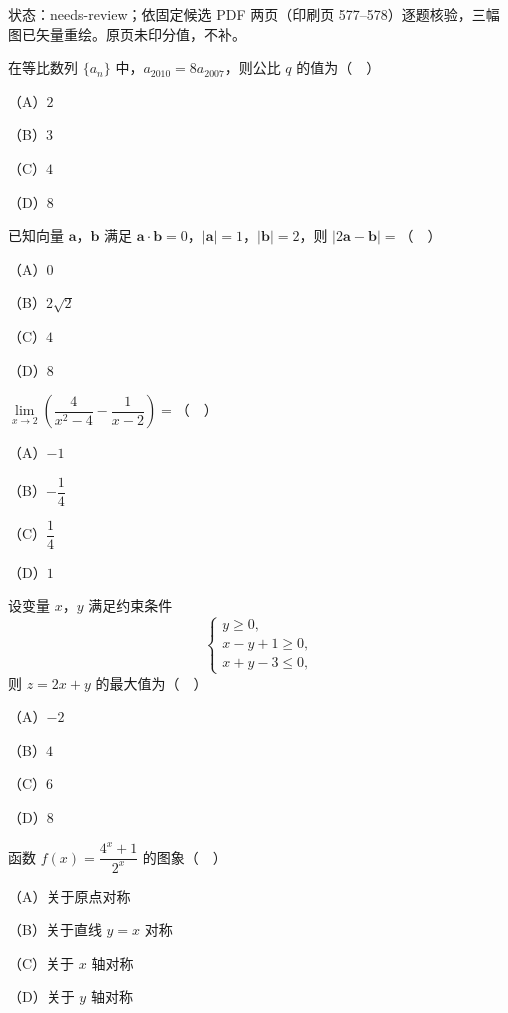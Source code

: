 状态：needs-review；依固定候选 PDF 两页（印刷页 577–578）逐题核验，三幅图已矢量重绘。原页未印分值，不补。
\begin{question}
在等比数列 $\{a_n\}$ 中，$a_{2010}=8a_{2007}$，则公比 $q$ 的值为（　）

（A）$2$

（B）$3$

（C）$4$

（D）$8$

\end{question}
\begin{question}
已知向量 $\boldsymbol a$，$\boldsymbol b$ 满足 $\boldsymbol a\cdot\boldsymbol b=0$，$|\boldsymbol a|=1$，$|\boldsymbol b|=2$，则 $|2\boldsymbol a-\boldsymbol b|=$（　）

（A）$0$

（B）$2\sqrt2$

（C）$4$

（D）$8$

\end{question}
\begin{question}
$\lim\limits_{x\to2}\left(\dfrac{4}{x^2-4}-\dfrac{1}{x-2}\right)=$（　）

（A）$-1$

（B）$-\dfrac14$

（C）$\dfrac14$

（D）$1$

\end{question}
\begin{question}
设变量 $x$，$y$ 满足约束条件
\nopagebreak[4]
\[\begin{cases}y\geqslant0,\\x-y+1\geqslant0,\\x+y-3\leqslant0,\end{cases}\]
则 $z=2x+y$ 的最大值为（　）

（A）$-2$

（B）$4$

（C）$6$

（D）$8$

\end{question}
\begin{question}
函数 $f(x)=\dfrac{4^x+1}{2^x}$ 的图象（　）

（A）关于原点对称

（B）关于直线 $y=x$ 对称

（C）关于 $x$ 轴对称

（D）关于 $y$ 轴对称

\Needspace{0.4\textheight}
\end{question}
